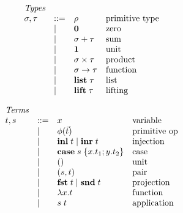 \begin{figure}
  \begin{subfigure}[t]{0.48\linewidth}
  \small
  \[
  \begin{array}{lllll}
    & \textit{Types}
    \\
    &
    \sigma, \tau
    & ::= &
    \rho
    &
    \text{primitive type}
    \\
    && \mid &
    \mathbf{0}
    &
    \text{zero}
    \\
    && \mid &
    \sigma + \tau
    &
    \text{sum}
    \\
    && \mid &
    \mathbf{1}
    &
    \text{unit}
    \\
    && \mid &
    \sigma \times \tau
    &
    \text{product}
    \\
    && \mid &
    \sigma \to \tau
    &
    \text{function}
    \\
    && \mid &
    \mathbf{list}\;\tau
    &
    \text{list}
    \\
    && \mid &
    \mathbf{lift}\;\tau
    &
    \text{lifting}
  \end{array}
  \]
  \end{subfigure}%
  \begin{subfigure}[t]{0.48\linewidth}
  \small
  \[
  \begin{array}{lllll}
    & \textit{Terms}
    \\
    &
    t, s
    & ::= &
    x
    &
    \text{variable}
    \\
    && \mid &
    \phi(\vec t)
    &
    \text{primitive op}
    \\
    && \mid &
    \mathbf{inl}\;t \mid \mathbf{inr}\;t
    &
    \text{injection}
    \\
    && \mid &
    \mathbf{case}\;s\;\{x.t_1; y.t_2\}
    &
    \text{case}
    \\
    && \mid &
    ()
    &
    \text{unit}
    \\
    && \mid &
    (s,t)
    &
    \text{pair}
    \\
    && \mid &
    \mathbf{fst}\;t \mid \mathbf{snd}\;t
    &
    \text{projection}
    \\
    && \mid &
    \lambda x.t
    &
    \text{function}
    \\
    && \mid &
    s\;t
    &
    \text{application}

\end{array}\]
\end{subfigure}
\end{figure}

